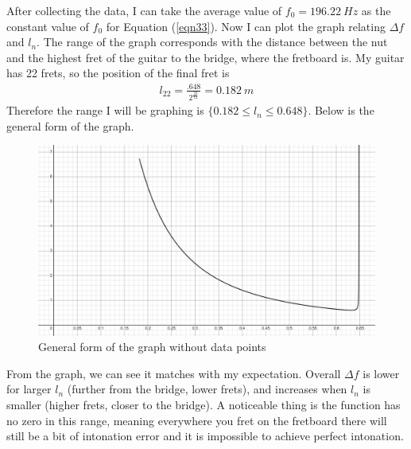 After collecting the data, I can take the average value of $f_0 = \SI{196.22}{Hz}$ as the constant value of $f_0$ for Equation (\ref{eqn33}). Now I can plot the graph relating $\Delta f$ and $l_n$. The range of the graph corresponds with the distance between the nut and the highest fret of the guitar to the bridge, where the fretboard is. My guitar has 22 frets, so the position of the final fret is
\begin{align*}
    l_{22} = \frac{.648}{2^{\frac{22}{12}}} = \SI{0.182}{m}
\end{align*} 
Therefore the range I will be graphing is $\{0.182 \le l_n \le 0.648 \}$. Below is the general form of the graph.\par
\FloatBarrier
\begin{figure}[!ht]
    \includegraphics[width = \textwidth]{./ee/no_data_graph.png}
    \caption{General form of the graph without data points} \label{fig8}
\end{figure}
\FloatBarrier
From the graph, we can see it matches with my expectation. Overall $\Delta f$ is lower for larger $l_n$ (further from the bridge, lower frets), and increases when $l_n$ is smaller (higher frets, closer to the bridge). A noticeable thing is the function has no zero in this range, meaning everywhere you fret on the fretboard there will still be a bit of intonation error and it is impossible to achieve perfect intonation.\par
